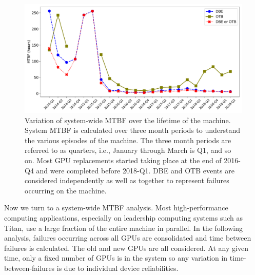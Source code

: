 \begin{figure}[bt]
  \begin{center}
    \includegraphics[width=\columnwidth]{figs/MTBF_quaterly_sys.pdf}
  \end{center}
  \caption{Variation of system-wide MTBF over the lifetime of the machine. System MTBF is calculated over 
three month periods to understand the various episodes of the machine. The three month periods are 
referred to as quarters, i.e., January through March is Q1, and so on. Most GPU replacements started taking 
place at the end of 2016-Q4 and were completed before 2018-Q1. DBE and OTB events are 
considered independently as well as together to represent failures occurring on the machine.}
  \label{fig:MTBF_sys}
\end{figure}

Now we turn to a system-wide MTBF analysis. Most high-performance
computing applications, especially on leadership computing
systems such as Titan, use a large fraction of the entire machine in parallel.  
In the following analysis, failures occurring across all GPUs are consolidated and time between failures
is calculated. The old and new GPUs are all considered. At any given time, only a fixed number of GPUs
is in the system so any variation in time-between-failures is due to individual device reliabilities.

